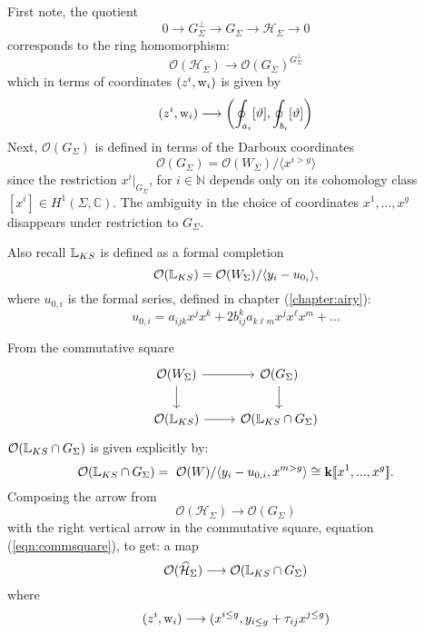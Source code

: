     First note, the quotient
    \[ 0 \rightarrow G_\Sigma^\perp \rightarrow G_\Sigma \rightarrow \mathcal{H}_\Sigma \rightarrow 0  \]
    corresponds to the ring homomorphism:
    \[ 
    \mathcal{O}(\mathcal{H}_\Sigma)    \longrightarrow   \mathcal{O}({G_\Sigma})^{G_\Sigma^\perp}\] 
    which in terms of coordinates \(( z^i, \mathrm{w}_i )\) is given by 
    \[ 
    (z^i,\mathrm{w}_i) \longrightarrow     \left(\oint_{a_i}[\vartheta],\oint_{b_i}[\vartheta]\right)\]
    Next, \( \mathcal{O}(G_\Sigma)\) is defined in terms of the Darboux coordinates 
    \[ 
    \mathcal{O}(G_\Sigma) =\mathcal{O}(W_\Sigma)/\langle x^{i>g} \rangle 
    \] 
    since the restriction \(x^i |_{G_\Sigma}\), for \(i\in\mathbb{N}\) depends only on its cohomology class \([x^i]\in H^1(\Sigma, \mathbb{C})\). The ambiguity in the choice of coordinates \(x^1,\dots,x^g\) disappears under restriction to \(G_\Sigma\).  
    
    Also recall \( \mathbb{L}_{KS}\) is defined as a formal completion
    \[ 
    \mathcal{O}(\mathbb{L}_{KS}) =\mathcal{O}(W_\Sigma ) /\langle y_i - u_{0_i}\rangle ,
    \] 
    where \( u_{0,i}\) is the formal series, defined in chapter (\ref{chapter:airy}):
    \[ u_{0,i} = a_{ijk}x^jx^k+2b_{ij}^ka_{k\ell m}x^jx^\ell x^m+ \dots \]
    
    From the commutative square
    \begin{equation}
    \label{eqn:commsquare}
    \begin{tikzcd}
         \mathcal{O}(W_\Sigma) \arrow[r] \arrow[d] & \mathcal{O}(G_\Sigma)\arrow[d]\\
    \mathcal{O}(\cL_{KS}) \arrow[r] & \mathcal{O}(\cL_{KS} \cap G_\Sigma) 
    \end{tikzcd}
    \end{equation}
    \(\mathcal{O}(\mathbb{L}_{KS}\cap G_\Sigma )\) is given explicitly by:
    \[
    \mathcal{O}(\cL_{KS}\cap G_\Sigma )=\ \mathcal{O}(W) / \langle y_i-u_{0,i} , x^{m>g} \rangle \cong \mathbf{k} \lBrack x^1,...,x^g \rBrack.
    \] 
    Composing the arrow from \[ \mathcal{O}(\mathcal{H}_\Sigma) \rightarrow  \mathcal{O} (G_\Sigma) \]
    with the right vertical arrow in the commutative square, equation (\ref{eqn:commsquare}), to get:
    a map 
    \begin{equation}            
    \label{eqn:BLcorr}
    \mathcal{O}(\widehat{\mathcal{H}}_\Sigma) \longrightarrow \mathcal{O}(\mathbb{L}_{KS}\cap G_\Sigma)  
    \end{equation} 
    where 
    \[ 
    (z^i,\mathrm{w}_i)\longrightarrow (x^{i \leq g},y_{i\leq g}+\tau_{ij}x^{j \leq g})
     \] 
      

